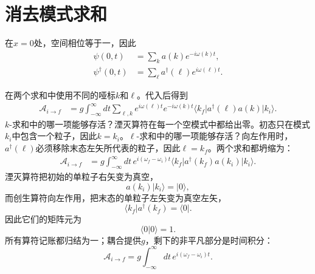 \section{消去模式求和}

在\(x=0\)处，空间相位等于一，因此
\begin{align}
\psi(0,t)&=\sum_k a(k)e^{-i\omega(k)t},\\
\psi^\dagger(0,t)&=\sum_\ell a^\dagger(\ell)e^{i\omega(\ell)t}.
\end{align}

\begin{classroomqa}
\end{classroomqa}

在两个求和中使用不同的哑标\(k\)和\(\ell\)。代入后得到
\begin{align}
\mathcal A_{i\to f}
&=g\int_{-\infty}^{\infty}dt
\sum_{\ell,k}
e^{i\omega(\ell)t}e^{-i\omega(k)t}
\langle k_f\rvert a^\dagger(\ell)a(k)\lvert k_i\rangle.
\end{align}
\(k\)-求和中的哪一项能够存活？湮灭算符在每一个空模式中都给出零。初态只在模式\(k_i\)中包含一个粒子，因此\(k=k_i\)。\(\ell\)-求和中的哪一项能够存活？向左作用时，\(a^\dagger(\ell)\)必须移除末态左矢所代表的粒子，因此\(\ell=k_f\)。两个求和都坍缩为：
\begin{align}
\mathcal A_{i\to f}
&=g\int_{-\infty}^{\infty}dt\,
e^{i(\omega_f-\omega_i)t}
\langle k_f\rvert a^\dagger(k_f)a(k_i)\lvert k_i\rangle.
\end{align}
湮灭算符把初始的单粒子右矢变为真空，
\begin{equation}
a(k_i)\lvert k_i\rangle=\lvert0\rangle,
\end{equation}
而创生算符向左作用，把末态的单粒子左矢变为真空左矢，
\begin{equation}
\langle k_f\rvert a^\dagger(k_f)=\langle0\rvert.
\end{equation}
因此它们的矩阵元为
\begin{equation}
\langle0\vert0\rangle=1.
\end{equation}
所有算符记账都归结为一；耦合提供\(g\)，剩下的非平凡部分是时间积分：
\begin{equation}
\mathcal A_{i\to f}
=g\int_{-\infty}^{\infty}dt\,
e^{i(\omega_f-\omega_i)t}.
\end{equation}


